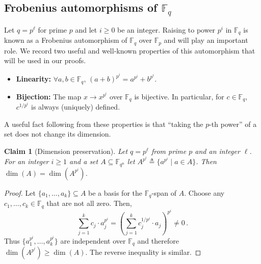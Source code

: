 \documentclass[10pt]{article}
\newtheorem{claim}[theorem]{Claim}
\theoremstyle{definition}
\numberwithin{equation}{section}
\newcommand{\F}{\mathbb F_q}
\newcommand{\Fn}{\mathbb F_{q^n}}
\begin{document}
\subsection{Frobenius automorphisms of \texorpdfstring{$\F$}{F}}\label{subsec:frobenius}
Let $q=p^{\ell}$ for prime $p$ and let $i\geq 0$ be an integer.
Raising to power $p^i$ in $\F$ is known as a Frobenius automorphism of $\F$ over $\mathbb{F}_p$ and will play an important role. We record two useful and well-known properties of this automorphism that will be used in our proofs.
\begin{itemize}
\item{\bf Linearity:} $\forall a,b \in \F$, $(a+b)^{p^i} = a^{p^i} + b^{p^i}$.
\item{\bf Bijection:} The map $x\to x^{p^i}$ over $\F$ is bijective. In particular,
for $c\in \F$, $c^{1/p^i}$ is always (uniquely) defined.
\end{itemize}

A useful fact following from these properties is that ``taking the
%
$p$-th
power'' of a set does not change its dimension.
\begin{claim}[Dimension preservation]\label{claim-frobenius_has_dim}
Let $q=p^{\ell}$ from prime $p$ and an integer $\ell$.
For an integer $i\geq 1$ and a set $A\subseteq\Fn$
let $A^{p^i}\triangleq \{a^{p^i}\mid a\in A\}$.
Then $\dim(A)=\dim(A^{p^i})$.
\end{claim}
\begin{proof}
Let $\{a_1,\ldots, a_k\}\subseteq A$ be a basis for the $\F$-span of $A$.
Choose any $c_1,\ldots,c_k\in \F$ that are not all zero.
 Then,
\[\sum_{j=1}^k c_j \cdot a_j^{p^i} = \left(\sum_{j=1}^k c_j^{1/p^i} \cdot a_j\right)^{p^i}\neq 0\,.\]
Thus $\{a_1^{p^i},\ldots, a_k^{p^i}\}$ are independent over $\F$ and therefore $\dim(A^{p^i})\geq \dim(A)$.
The reverse inequality is similar.
\end{proof}
\end{document}

